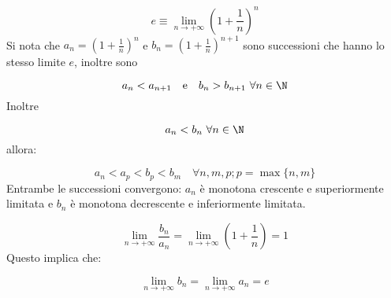 \documentclass[../appunti.tex]{subfiles}
\begin{document}
\begin{eser}

\begin{equation}
	e \equiv \lim \limits_{n \to + \infty} \left( 1 + \frac{1}{n} \right)^n
\end{equation}
Si nota che $a_n = \left( 1 + \frac{1}{n} \right)^n$ e $ b_n =
\left( 1 + \frac{1}{n} \right)^{n+1}$ sono successioni  che hanno lo stesso limite $ e $, inoltre sono  

\begin{equation}
	a_n < a_{n + 1} \quad \mbox{e} \quad b_n > b_{n+1} \ \forall n \in \N
\end{equation}
Inoltre 

\begin{equation}
	a_n < b_n\ \forall n \in \N 
\end{equation}
allora: 

\begin{equation}
	a_n < a_p < b_p < b_m \quad \forall n,m,p; p = \max \{n, m\}
\end{equation}
Entrambe le successioni convergono: $a_n$ è monotona crescente e superiormente limitata e $b_n$ è monotona decrescente e inferiormente limitata.

\begin{equation}
	\lim \limits_{n \to + \infty} \frac{b_n}{a_n} = 
	\lim \limits_{n \to + \infty} \left( 1 + \frac{1}{n} \right) = 1
\end{equation}
Questo implica che:

\begin{equation} 
	\lim \limits_{n \to + \infty} b_n = 
	\lim \limits_{n \to + \infty} a_n = e
\end{equation}

\end{eser}
\end{document}
